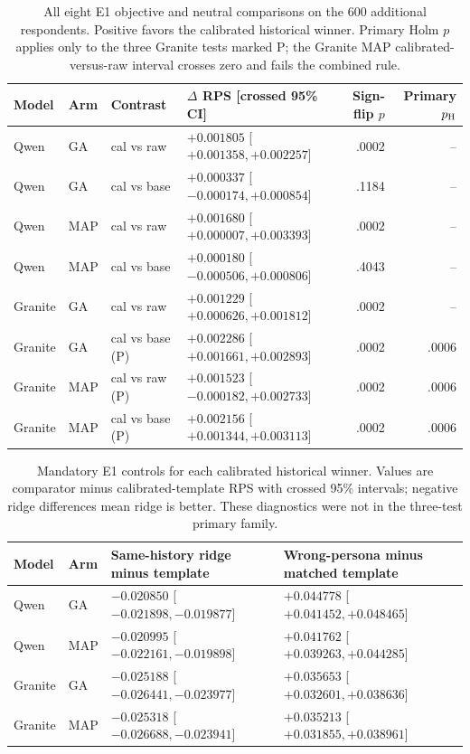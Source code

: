 \documentclass[10pt,twocolumn]{article}
\begin{document}
\begin{table}[H]\centering\scriptsize
\caption{All eight E1 objective and neutral comparisons on the 600 additional
respondents. Positive favors the calibrated historical winner. Primary Holm
$p$ applies only to the three Granite tests marked P; the Granite MAP
calibrated-versus-raw interval crosses zero and fails the combined rule.}
\label{tab:e1-contrasts}
\begin{tabular}{@{}llllrr@{}}\toprule
Model & Arm & Contrast & $\Delta$ RPS [crossed 95\% CI] & Sign-flip $p$ & Primary $p_{\rm H}$\\\midrule
Qwen & GA & cal vs raw & $+0.001805$ [$+0.001358,+0.002257$] & .0002 & --\\
Qwen & GA & cal vs base & $+0.000337$ [$-0.000174,+0.000854$] & .1184 & --\\
Qwen & MAP & cal vs raw & $+0.001680$ [$+0.000007,+0.003393$] & .0002 & --\\
Qwen & MAP & cal vs base & $+0.000180$ [$-0.000506,+0.000806$] & .4043 & --\\
Granite & GA & cal vs raw & $+0.001229$ [$+0.000626,+0.001812$] & .0002 & --\\
Granite & GA & cal vs base (P) & $+0.002286$ [$+0.001661,+0.002893$] & .0002 & .0006\\
Granite & MAP & cal vs raw (P) & $+0.001523$ [$-0.000182,+0.002733$] & .0002 & .0006\\
Granite & MAP & cal vs base (P) & $+0.002156$ [$+0.001344,+0.003113$] & .0002 & .0006\\\bottomrule
\end{tabular}\end{table}

\begin{table}[H]\centering\scriptsize
\caption{Mandatory E1 controls for each calibrated historical winner. Values
are comparator minus calibrated-template RPS with crossed 95\% intervals;
negative ridge differences mean ridge is better. These diagnostics were not
in the three-test primary family.}
\label{tab:e1-controls}
\begin{tabular}{@{}lll l@{}}\toprule
Model & Arm & Same-history ridge minus template & Wrong-persona minus matched template\\\midrule
Qwen & GA & $-0.020850$ [$-0.021898,-0.019877$] & $+0.044778$ [$+0.041452,+0.048465$]\\
Qwen & MAP & $-0.020995$ [$-0.022161,-0.019898$] & $+0.041762$ [$+0.039263,+0.044285$]\\
Granite & GA & $-0.025188$ [$-0.026441,-0.023977$] & $+0.035653$ [$+0.032601,+0.038636$]\\
Granite & MAP & $-0.025318$ [$-0.026688,-0.023941$] & $+0.035213$ [$+0.031855,+0.038961$]\\\bottomrule
\end{tabular}\end{table}
\end{document}
